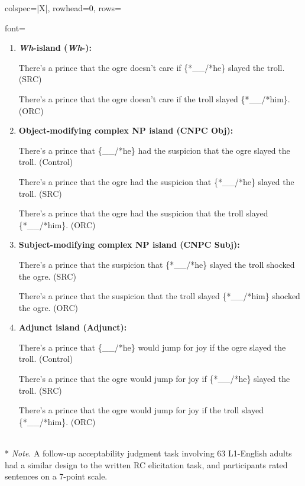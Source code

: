 \begin{longtblr}[caption={\textcite{morgan.wagers2018}: Written RC elicitation task}, label={tblr:morgan-wagers}]{colspec={|X|}, rowhead=0, rows={font=\raggedright{}}}
\begin{varwidth}{\linewidth}
\begin{enumerate}[\bfseries (a),itemsep=5pt]
\item \textbf{\textit{Wh}-island (\textit{Wh}-):}\par\nobreak
There's a prince that the ogre doesn't care if \{*\_\_/*he\} slayed the troll. (SRC)\par\nobreak
There's a prince that the ogre doesn't care if the troll slayed \{*\_\_/*him\}. (ORC)
\item \textbf{Object-modifying complex NP island (CNPC Obj):}\par\nobreak
There's a prince that \{\_\_/*he\} had the suspicion that the ogre slayed the troll. (Control)\par\nobreak
There's a prince that the ogre had the suspicion that \{*\_\_/*he\} slayed the troll. (SRC)\par\nobreak
There's a prince that the ogre had the suspicion that the troll slayed \{*\_\_/*him\}. (ORC)
\item \textbf{Subject-modifying complex NP island (CNPC Subj):}\par\nobreak
There's a prince that the suspicion that \{*\_\_/*he\} slayed the troll shocked the ogre. (SRC)\par\nobreak
There's a prince that the suspicion that the troll slayed \{*\_\_/*him\} shocked the ogre. (ORC)
\item \textbf{Adjunct island (Adjunct):}\par\nobreak
There's a prince that \{\_\_/*he\} would jump for joy if the ogre slayed the troll. (Control)\par\nobreak
There's a prince that the ogre would jump for joy if \{*\_\_/*he\} slayed the troll. (SRC)\par\nobreak
There's a prince that the ogre would jump for joy if the troll slayed \{*\_\_/*him\}. (ORC)
\end{enumerate}\end{varwidth}\vspace{5pt}\\*
\setlength{\leftskip}{5pt} \textit{Note}. A follow-up acceptability judgment task involving 63 L1-English adults had a similar design to the written RC elicitation task, and participants rated sentences on a 7-point scale. 
\\\hline
\end{longtblr}

